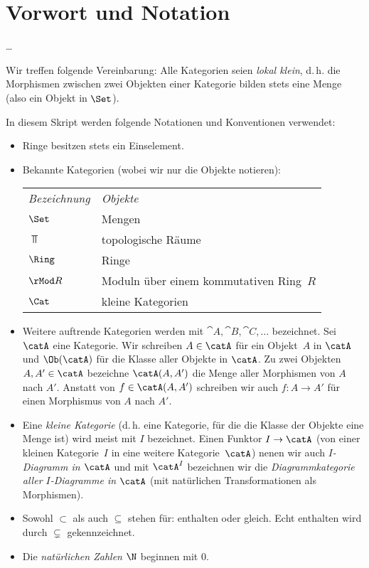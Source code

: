 
\chapter{Vorwort und Notation}
\ldots

\bigskip
Wir treffen folgende Vereinbarung:
Alle Kategorien seien \emph{lokal klein}, d.\,h. die Morphismen zwischen
zwei Objekten einer Kategorie bilden stets eine Menge (also ein Objekt
in $\Set$).

\bigskip
In diesem Skript werden folgende Notationen und Konventionen verwendet:
\begin{itemize}
    \item
        Ringe besitzen stets ein Einselement.
        
    \item
        Bekannte Kategorien (wobei wir nur die Objekte notieren):
        
        \hspace{6mm}
        \begin{tabular}{l@{\qquad}l}
            \emph{Bezeichnung} & \emph{Objekte}                         \\[2pt]
            $\Set$      &   Mengen                                      \\
            $\Top$      &   topologische Räume                          \\
            $\Ring$     &   Ringe                                       \\
            $\rMod R$   &   Moduln über einem kommutativen Ring~$R$     \\
            $\Cat$      &   kleine Kategorien
        \end{tabular}
        
    \item
        Weitere auftrende Kategorien werden mit $\cat A,\cat B, \cat C, \dots$
        bezeichnet. Sei $\catA$ eine Kategorie. Wir schreiben $A\in\catA$
        für ein Objekt~$A$ in $\catA$ und $\Ob(\catA)$ für die Klasse aller
        Objekte in $\catA$. Zu zwei Objekten $A,A'\in\catA$ bezeichne
        $\catA(A,A')$ die Menge aller Morphismen von $A$ nach $A'$.
        Anstatt von $f\in\catA(A,A')$ schreiben wir auch $f\colon A\to A'$ für
        einen Morphismus von $A$ nach $A'$.
        
    \item
        Eine \emph{kleine Kategorie} (d.\,h. eine Kategorie, für die die Klasse
        der Objekte eine Menge ist) wird meist mit $I$ bezeichnet. Einen Funktor
        $I\to\catA$ (von einer kleinen Kategorie~$I$ in eine weitere
        Kategorie~$\catA$) nenen wir auch \emph{$I$-Diagramm in $\catA$} und
        mit $\catA^I$ bezeichnen wir die \emph{Diagrammkategorie aller
        $I$-Diagramme in $\catA$} (mit natürlichen Transformationen als
        Morphismen).
        
    \item
        Sowohl $\subset$ als auch $\subseteq$ stehen für: enthalten oder gleich.
        Echt enthalten wird durch $\subsetneq$ gekennzeichnet.
        
    \item
        Die \emph{natürlichen Zahlen $\N$} beginnen mit $0$.
\end{itemize}
